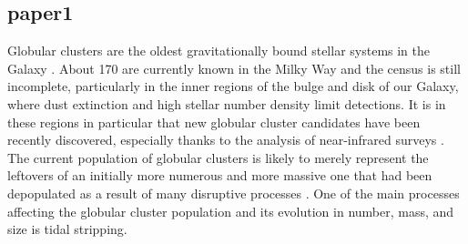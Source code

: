   \subsection{paper1}
Globular clusters are the oldest gravitationally bound stellar systems in the Galaxy \citep{meylan97}. About 170 are currently known in the Milky Way \citep{vasiliev21} and the census is still incomplete, particularly in the inner regions of the bulge and disk of our Galaxy, where  dust extinction and  high stellar number density limit detections. It is in these regions in particular that new globular cluster candidates have been recently discovered, especially thanks to the analysis of near-infrared surveys  
\citep{minniti11,monibidin11,minniti17a,minniti17b,minniti18,gran19,garro20,garro2022unveiling,garro2022inspection,garro21c,minniti21a,minniti21b,gran22}.  The current population of globular clusters  is likely to merely represent the leftovers of an initially more numerous and more massive one that had been depopulated as a result of many disruptive processes \citep{gnedin97, murali97a, murali97b, vesperini97, fall01}. One of the main processes affecting the globular cluster population and its evolution in number, mass, and size is tidal stripping.   

